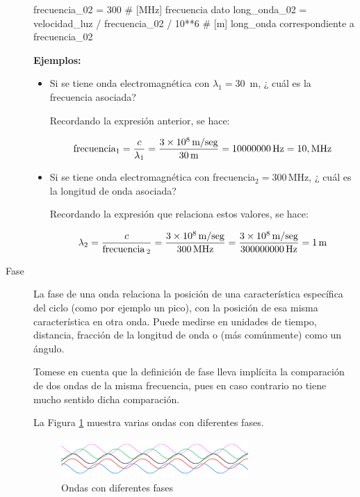 \begin{description}
\begin{tcolorbox}
\begin{sagesilent}
frecuencia_02 = 300         # [MHz] frecuencia dato
long_onda_02  = velocidad_luz / frecuencia_02 / 10**6 # [m] long_onda correspondiente a frecuencia_02

  \end{sagesilent}

{\bf Ejemplos:}

  \begin{itemize}
  \item Si se tiene onda electromagn\'etica con $\lambda_1 =
    30$ \,m, ¿ cu\'al es la frecuencia
    asociada?

    Recordando la expresi\'on anterior, se hace:

    \[ \text{frecuencia}_1 = \displaystyle \frac{c}{\lambda_1} =
    \displaystyle
    \frac{ 3\times10^8 \text{\,m/seg}}{ 30 \text{\,m}}
    =  10000000 \,\text{Hz} =
    10,\text{MHz}
    \]

  \item Si se tiene onda electromagn\'etica con frecuencia$_2 =
    300$\,MHz, ¿ cu\'al es la longitud de onda 
    asociada?

    Recordando la expresi\'on que relaciona estos valores, se hace:

\[ \displaystyle 
	\lambda_2 = \frac{c}{\text{frecuencia\,}_2} 
	= \frac{3\times10^8 \text{\,m/seg}}{ 300 \text{\,MHz}}
	= \frac{3\times10^8  \text{\,m/seg}}{ 300000000 \text{\,Hz}}
	=  1  \text{\,m}
\]

  \end{itemize}

\end{tcolorbox}


\item [Fase] La fase de una onda relaciona la posici\'on de una caracter\'istica espec\'ifica del ciclo (como por ejemplo un pico), con la posici\'on de esa misma caracter\'istica en otra onda. Puede medirse en unidades de tiempo, distancia, fracci\'on de la longitud de onda o (m\'as com\'unmente) como un \'angulo.

Tomese en cuenta que la definici\'on de fase lleva impl\'icita la comparaci\'on de dos ondas de la misma frecuencia, pues en caso contrario no tiene mucho sentido dicha comparaci\'on.

La Figura \ref{fig:desfase-ondas} muestra varias ondas con diferentes fases. 

\begin{figure}[!h]
  \centering
  \includegraphics[width=0.7\textwidth]{06.radionavegacion/Imagenes/06.01.adf/desfase-ondas.png}
  \caption{Ondas con diferentes fases \protect\cite{wikipedia_esp}}
  \label{fig:desfase-ondas}
\end{figure}



\end{description}
